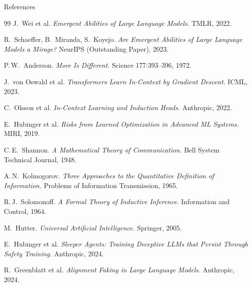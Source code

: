 \documentclass[aspectratio=169, 12pt, xcolor={dvipsnames,table}]{beamer}
\begin{document}
\appendix
\begin{frame}[allowframebreaks]{References}
  \footnotesize
  \begin{thebibliography}{99}
    J.\ Wei et al.
    \newblock \emph{Emergent Abilities of Large Language Models.}
    \newblock TMLR, 2022.

    R.\ Schaeffer, B.\ Miranda, S.\ Koyejo.
    \newblock \emph{Are Emergent Abilities of Large Language Models a Mirage?}
    \newblock NeurIPS (Outstanding Paper), 2023.

    P.\,W.\ Anderson.
    \newblock \emph{More Is Different.}
    \newblock Science 177:393--396, 1972.

    J.\ von Oswald et al.
    \newblock \emph{Transformers Learn In-Context by Gradient Descent.}
    \newblock ICML, 2023.

    C.\ Olsson et al.
    \newblock \emph{In-Context Learning and Induction Heads.}
    \newblock Anthropic, 2022.

    E.\ Hubinger et al.
    \newblock \emph{Risks from Learned Optimization in Advanced ML Systems.}
    \newblock MIRI, 2019.

    C.\,E.\ Shannon.
    \newblock \emph{A Mathematical Theory of Communication.}
    \newblock Bell System Technical Journal, 1948.

    A.\,N.\ Kolmogorov.
    \newblock \emph{Three Approaches to the Quantitative Definition of Information.}
    \newblock Problems of Information Transmission, 1965.

    R.\,J.\ Solomonoff.
    \newblock \emph{A Formal Theory of Inductive Inference.}
    \newblock Information and Control, 1964.

    M.\ Hutter.
    \newblock \emph{Universal Artificial Intelligence.}
    \newblock Springer, 2005.

    E.\ Hubinger et al.
    \newblock \emph{Sleeper Agents: Training Deceptive LLMs that Persist Through Safety Training.}
    \newblock Anthropic, 2024.

    R.\ Greenblatt et al.
    \newblock \emph{Alignment Faking in Large Language Models.}
    \newblock Anthropic, 2024.


\end{thebibliography}
\end{frame}
\end{document}
